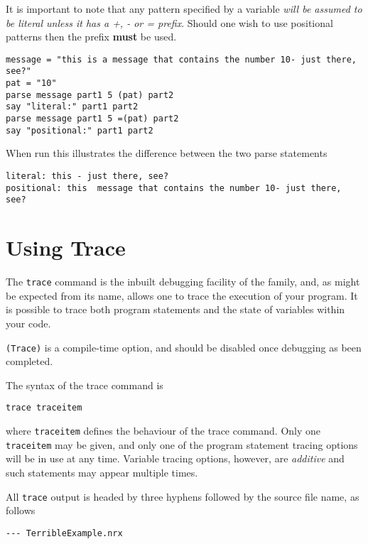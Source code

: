 It is important to note that any pattern specified by a variable \textit{will be assumed to be literal unless it has a +, - or = prefix}. Should one wish to use positional patterns then the prefix \textbf{must} be used.
\begin{lstlisting}[label=variablePosPattern, caption=Variables in Positional Patterns]
message = "this is a message that contains the number 10- just there, see?"
pat = "10"
parse message part1 5 (pat) part2
say "literal:" part1 part2
parse message part1 5 =(pat) part2
say "positional:" part1 part2
\end{lstlisting}
When run this illustrates the difference between the two parse statements
\begin{verbatim}
literal: this - just there, see? 
positional: this  message that contains the number 10- just there, see?
\end{verbatim}
\chapter{Using Trace}
The \texttt{trace} command is the inbuilt debugging facility of the \Rexx{} family, and, as might be expected from its name, allows one to trace the execution of your program. It is possible to trace both program statements and the state of variables within your code.

\texttt{(Trace)} is a compile-time option, and should be disabled once debugging as been completed.

The syntax of the trace command is
\begin{verbatim}
trace traceitem 
\end{verbatim}
where \texttt{traceitem} defines the behaviour of the trace command. Only one \texttt{traceitem} may be given, and only one of the program statement tracing options will be in use at any time. 
Variable tracing options, however, are \textit{additive} and such statements may appear multiple times.

All \texttt{trace} output is headed by three hyphens followed by the source file name, as follows
\begin{verbatim}
--- TerribleExample.nrx
\end{verbatim}

